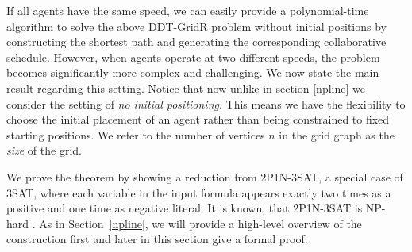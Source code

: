 If all agents have the same speed, we can easily provide a polynomial-time algorithm to solve the above DDT-GridR problem without initial positions by constructing the shortest path and generating the corresponding collaborative schedule. However, when agents operate at two different speeds, the problem becomes significantly more complex and challenging.  
We now state the main result regarding this setting. Notice that now unlike in section \ref{npline} we consider the setting of \emph{no initial positioning}. This means we have the flexibility to choose the initial placement of an agent rather than being constrained to fixed starting positions. We refer to the number of vertices $n$ in the grid graph as the \textit{size} of the grid.


\thmgrid*



 We prove the theorem by showing a reduction from \textsc{2P1N-3SAT}, a special case of \textsc{3SAT}, where each variable in the input formula appears exactly two times as a positive and one time as negative literal. 
It is known, that \textsc{2P1N-3SAT} is NP-hard \cite{ryo:2p1nsat}. 
As in Section~\ref{npline}, we will provide a high-level overview of the construction first and later in this section give a formal proof.


